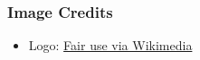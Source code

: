 \documentclass[
  a4paper,
]{article}
\providecommand{\tightlist}{%
  \setlength{\itemsep}{0pt}\setlength{\parskip}{0pt}}
\begin{document}
\subsubsection{Image Credits}\label{image-credits}

\begin{itemize}
\tightlist
\item
  Logo:
  \href{https://upload.wikimedia.org/wikipedia/commons/thumb/b/b7/The_logo_simpsons_yellow.png/1200px-The_logo_simpsons_yellow.png?20210413044310}{Fair
  use via Wikimedia}
\end{itemize}
\end{document}
